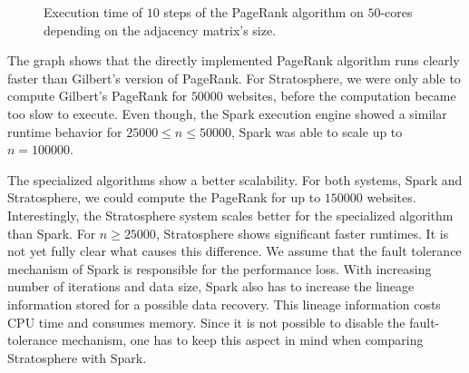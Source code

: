 \begin{figure}
	\centering
	\caption{Execution time of $10$ steps of the PageRank algorithm on $50$-cores depending on the adjacency matrix's size.}
	\label{fig:pageRankResults}
\end{figure}

The graph shows that the directly implemented PageRank algorithm runs clearly faster than Gilbert's version of PageRank.
For Stratosphere, we were only able to compute Gilbert's PageRank for $50000$ websites, before the computation became too slow to execute.
Even though, the Spark execution engine showed a similar runtime behavior for $25000 \le n \le 50000$, Spark was able to scale up to $n=100000$.

The specialized algorithms show a better scalability.
For both systems, Spark and Stratosphere, we could compute the PageRank for up to $150000$ websites.
Interestingly, the Stratosphere system scales better for the specialized algorithm than Spark.
For $n\ge 25000$, Stratosphere shows significant faster runtimes.
It is not yet fully clear what causes this difference.
We assume that the fault tolerance mechanism of Spark is responsible for the performance loss.
With increasing number of iterations and data size, Spark also has to increase the lineage information stored for a possible data recovery.
This lineage information costs CPU time and consumes memory.
Since it is not possible to disable the fault-tolerance mechanism, one has to keep this aspect in mind when comparing Stratosphere with Spark.

